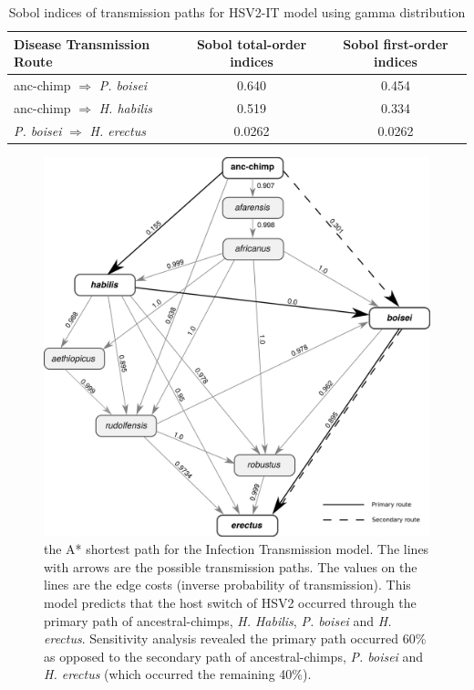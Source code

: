 \documentclass[fleqn,10pt]{wlscirep}
\begin{document}
\begin{table}[!tbhp]
\caption{Sobol indices of transmission paths for HSV2-IT model using gamma distribution}
\centering
\renewcommand{\arraystretch}{1.5}
\label{table:sobol}
\begin{tabulary}{\linewidth}{LCC}
\toprule
Disease Transmission Route & 
Sobol total-order indices & 
Sobol first-order indices \\ 
\midrule
anc-chimp $\Rightarrow$ \textit{P. boisei} & 0.640 & 0.454\\


anc-chimp $\Rightarrow$ \textit{H. habilis} & 0.519 & 0.334 \\

\textit{P. boisei} $\Rightarrow$ \textit{H. erectus} & 0.0262 & 0.0262 \\
\bottomrule
\end{tabulary}
\end{table}

  

\begin{figure}[!tbhp]
  \centering
  \includegraphics[width=\textwidth]{figs/dag-it}
  \caption{the A* shortest path for the Infection Transmission model. The lines with arrows are the possible transmission paths. The values on the lines are the edge costs (inverse probability of transmission). This model predicts that the host switch of HSV2 occurred through the primary path of ancestral-chimps, \textit{H. Habilis}, \textit{P. boisei} and \textit{H. erectus}. Sensitivity analysis revealed the primary path occurred 60\% as opposed to the secondary path of ancestral-chimps, \textit{P. boisei} and \textit{H. erectus} (which occurred the remaining 40\%).}
  \label{fig:dag-it}   
\end{figure}     
\end{document}
